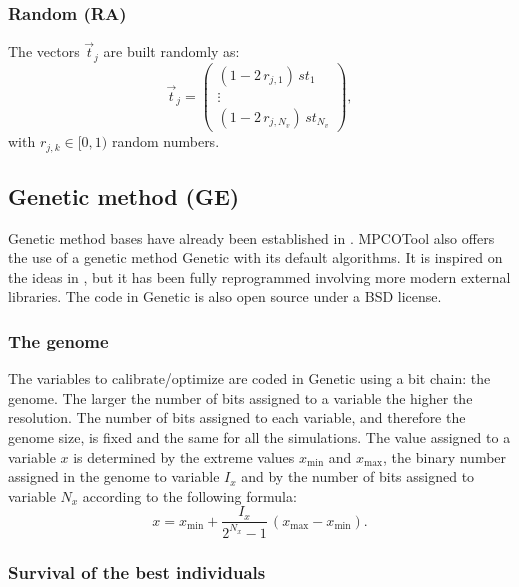 \documentclass[review,authoryear]{elsarticle}
\newcommand{\EQ}[2]
{\begin{equation}#1\label{#2}\end{equation}}
\newcommand{\MATRIX}[2]{\PA{\begin{array}{#1}#2\end{array}}}
\newcommand{\PA}[1]{\left(#1\right)}
\begin{document}
\subsubsection{Random (RA)}

The vectors $\vec{t}_j$ are built randomly as:
\EQ
{
	\vec{t}_j=\MATRIX{c}{\PA{1-2\,r_{j,1}}\,st_1\\\vdots\\
	\PA{1-2\,r_{j,N_v}}\,st_{N_v}},
}{EqtRandom}
with $r_{j,k}\in[0,1)$ random numbers.

\subsection{Genetic method (GE)}

Genetic method bases have already been established in \citet{Holland75}.
MPCOTool also offers the use of a genetic method Genetic \citep{genetic} with
its default algorithms. It is inspired on the ideas in \citet{gaul}, but it has
been fully reprogrammed involving more modern external libraries. The code in
Genetic is also open source under a BSD license.

\subsubsection{The genome}

The variables to calibrate/optimize are coded in Genetic using a bit chain: the
genome. The larger the number of bits assigned to a variable the higher the resolution.
The number of bits assigned to each variable, and therefore the genome size, is fixed and the same for all the 
simulations.
The value assigned to a variable $x$ is determined by the extreme values $x_{\min}$ and $x_{\max}$, the binary number assigned in the genome to variable $I_x$ and by the number of bits assigned to variable $N_x$ according to
the following formula:
\EQ{x=x_{\min}+\frac{I_x}{2^{N_x}-1}\,\left(x_{\max}-x_{\min}\right).}{EqGenome}

\subsubsection{Survival of the best individuals}
\end{document}
